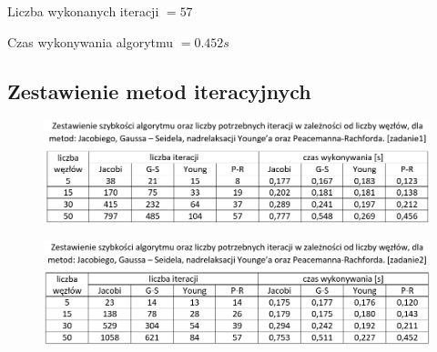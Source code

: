 Liczba wykonanych iteracji $ = 57 $

Czas wykonywania algorytmu $ = 0.452 s$

\newpage

\subsection{Zestawienie metod iteracyjnych}
\begin{figure}[!ht]
	\begin{center}
		\includegraphics[width=1\textwidth]{Lab6/charts/zestawienie_zad1.png}
	\end{center}
\end{figure}

\begin{figure}[!ht]
	\begin{center}
		\includegraphics[width=1\textwidth]{Lab6/charts/zestawienie_zad2.png}
	\end{center}
\end{figure}